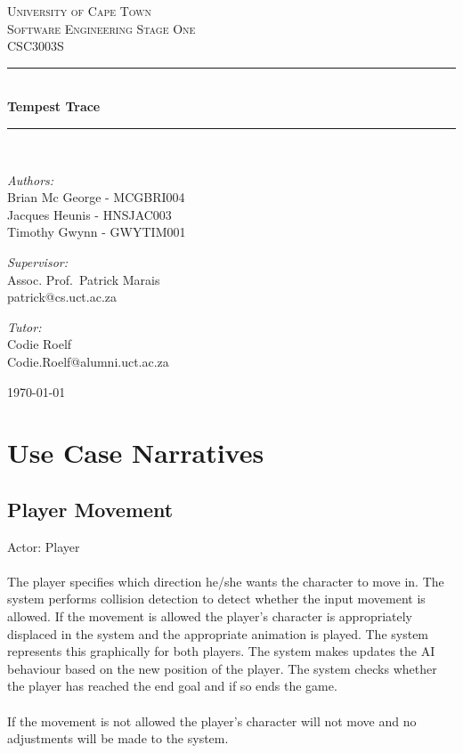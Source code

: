 \documentclass[a4paper,10pt]{article}
\begin{document}
\begin{titlepage} \begin{center} 
		\textsc{\LARGE University of Cape Town}
		\\[1.5cm] \textsc{\Large Software Engineering Stage One\\CSC3003S}
		\\[0.5cm]
		\noindent\rule[0.4mm]{\textwidth}{0.1mm}
		\\[0.4cm] { \huge \bfseries Tempest Trace \\[0.4cm] }
		\noindent\rule[0.4mm]{\textwidth}{0.1mm}
		\\[1cm]
		\begin{minipage}[t]{0.4\textwidth}
		\begin{flushleft}\large \emph{Authors:}\\ Brian Mc George - MCGBRI004 \\ Jacques Heunis - HNSJAC003 \\ Timothy Gwynn - GWYTIM001\end{flushleft}
		 \end{minipage} \begin{minipage}[t]{0.4\textwidth} 
		\begin{flushright} \large \emph{Supervisor:} \\ Assoc. Prof.~Patrick Marais\\patrick@cs.uct.ac.za\end{flushright}
		\begin{flushright} \large \emph{Tutor:} \\ Codie Roelf\\Codie.Roelf@alumni.uct.ac.za\end{flushright}
		 \end{minipage} \vfill {\large \today}
		\end{center}
		\end{titlepage}
\newpage
\tableofcontents
\newpage

\section{Use Case Narratives}
\subsection{Player Movement}
Actor: Player\\\\
The player specifies which direction he/she wants the character to move in. The system performs collision detection to detect whether the input movement is allowed. If the movement is allowed the player's character is appropriately displaced in the system and the appropriate animation is played. The system represents this graphically for both players. The system makes updates the AI behaviour based on the new position of the player. The system checks whether the player has reached the end goal and if so ends the game.\\\\
If the movement is not allowed the player's character will not move and no adjustments will be made to the system.
\end{document}
